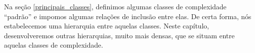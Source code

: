 Na seção \ref{principais_classes},
definimos algumas classes de complexidade ``padrão''
e impomos algumas relações de inclusão entre elas.
De certa forma, nós estabelecemos uma hierarquia entre aquelas classes.
Neste capítulo,
desenvolveremos outras hierarquias,
muito mais densas,
que se situam entre aquelas classes de complexidade.
